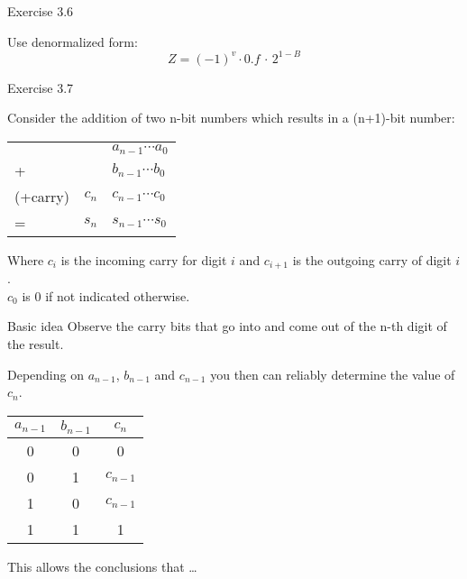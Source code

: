\documentclass[11pt]{tudbeamer}
\begin{document}
\begin{frame}{Exercise 3.6}

	Use denormalized form:
	$$Z = (-1)^v \cdot 0.f\, \cdot \, 2^{1-B}$$

\end{frame}

\begin{frame}[allowframebreaks]{Exercise 3.7}

	Consider the addition of two n-bit numbers which results in a (n+1)-bit number:\\
	\vspace{1em}

	\begin{center}		
	\begin{tabular}{lrl}
			&		&$a_{n-1} \cdots a_0$ \\
		+	&		&$b_{n-1} \cdots b_0$ \\
		\hline 
		(+carry)	&$c_n$ 	&$c_{n-1} \cdots c_0$ \\
		\hline
		=	&$s_n$ &$s_{n-1} \cdots s_0$ \\
	\end{tabular}
	\end{center}
	
	Where $c_i$ is the incoming carry for digit $i$ and $c_{i+1}$ is the outgoing carry of digit $i$. \\
	$c_0$ is 0 if not indicated otherwise.
	
	\begin{block}{Basic idea}
		Observe the carry bits that go into and come out of the n-th digit of the result.
	\end{block}
	
\framebreak

	Depending on $a_{n-1}$, $b_{n-1}$ and $c_{n-1}$ you then can reliably determine the value of $c_n$.

	\begin{center}
	\begin{tabular}{cc|c}
		$a_{n-1}$	& $b_{n-1}$	& $c_n$ \\
		\hline
		0			& 0			& 0		\\
		0			& 1			& $c_{n-1}$ \\
		1			& 0			& $c_{n-1}$ \\
		1			& 1			& 1 \\
	\end{tabular}
	\end{center}
	
	This allows the conclusions that \dots


\end{frame}
\end{document}
